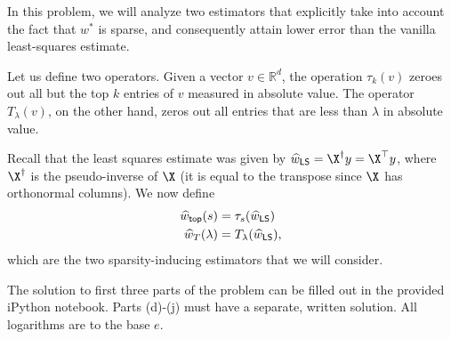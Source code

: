 \documentclass[preview]{standalone}
\begin{document}
In this problem, we will analyze two estimators that explicitly take into account the fact that $w^*$ is sparse, and consequently attain lower error than the vanilla least-squares estimate.

Let us define two operators. Given a vector $v \in \mathbb{R}^d$, the operation $\tau_k (v)$ zeroes out all but the top $k$ entries of $v$ measured in absolute value. The operator $T_{\lambda}(v)$, on the other hand, zeros out all entries that are less than $\lambda$ in absolute value.

Recall that the least squares estimate was given by $\widehat{w}_{{\sf LS}} = \X^{\dagger} y = \X^\top y$, where $\X^\dagger$ is the pseudo-inverse of $\X$ (it is equal to the transpose since $\X$ has orthonormal columns). We now define
\begin{align*}
\widehat{w}_{{\sf top}}(s) &= \tau_s(\widehat{w}_{{\sf LS}}) \\
\widehat{w}_T(\lambda) &= T_\lambda (\widehat{w}_{{\sf LS}}),
\end{align*}
which are the two sparsity-inducing estimators that we will consider.

The solution to first three parts of the problem can be filled out in the provided iPython notebook.
Parts (d)-(j) must have a separate, written solution. All logarithms are to the base $e$.
\end{document}
